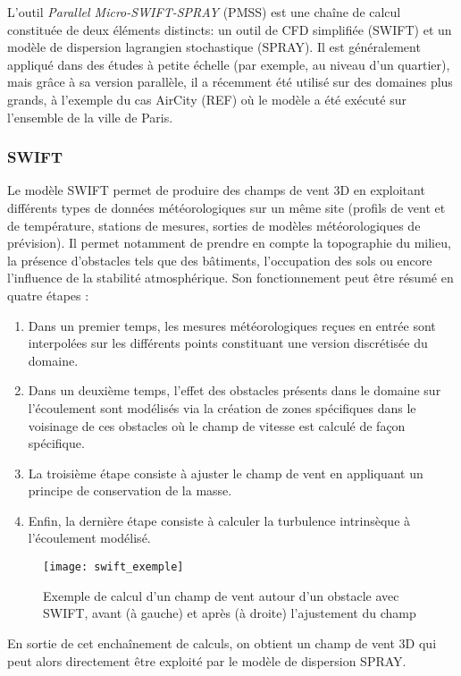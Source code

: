 L'outil \textit{Parallel Micro-SWIFT-SPRAY} (PMSS) est une chaîne de calcul constituée de deux éléments distincts: un outil de CFD simplifiée (SWIFT) et un modèle de dispersion lagrangien stochastique (SPRAY). Il est généralement appliqué dans des études à petite échelle (par exemple, au niveau d'un quartier), mais grâce à sa version parallèle, il a récemment été utilisé sur des domaines plus grands, à l'exemple du cas AirCity (REF) où le modèle a été exécuté sur l'ensemble de la ville de Paris.\\

\subsubsection{SWIFT}

Le modèle SWIFT permet de produire des champs de vent 3D en exploitant différents types de données météorologiques sur un même site (profils de vent et de température, stations de mesures, sorties de modèles météorologiques de prévision). Il permet notamment de prendre en compte la topographie du milieu, la présence d'obstacles tels que des bâtiments, l'occupation des sols ou encore l'influence de la stabilité atmosphérique. Son fonctionnement peut être résumé en quatre étapes :  \\

\begin{enumerate}
	\item Dans un premier temps, les mesures météorologiques reçues en entrée sont interpolées sur les différents points constituant une version discrétisée du domaine.
	\item Dans un deuxième temps, l'effet des obstacles présents dans le domaine sur l'écoulement sont modélisés via la création de zones spécifiques dans le voisinage de ces obstacles où le champ de vitesse est calculé de façon spécifique.
	\item La troisième étape consiste à ajuster le champ de vent en appliquant un principe de conservation de la masse.
	\item Enfin, la dernière étape consiste à calculer la turbulence intrinsèque à l'écoulement modélisé.\\
\end{enumerate}

\begin{figure}[h!]
	\centering
	\texttt{[image: swift\_exemple]}
	\caption{Exemple de calcul d'un champ de vent autour d'un obstacle avec SWIFT, avant (à gauche) et après (à droite) l'ajustement du champ}
	\label{fig_swift_exemple}
\end{figure}
En sortie de cet enchaînement de calculs, on obtient un champ de vent 3D qui peut alors directement être exploité par le modèle de dispersion SPRAY.



